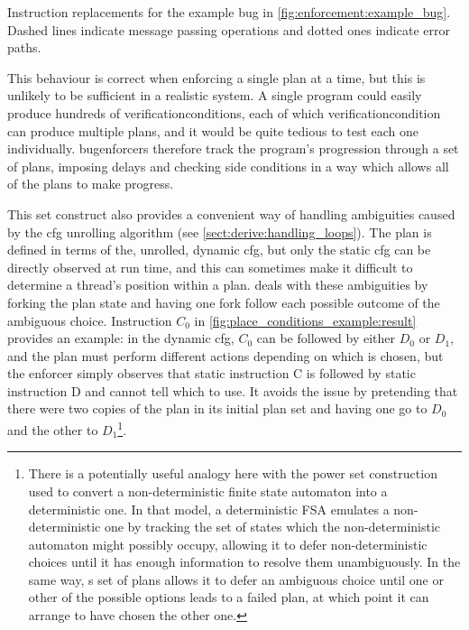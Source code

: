 \begin{sanefig}
  {\hfill}
  \caption{Instruction replacements for the example bug in
    \autoref{fig:enforcement:example_bug}.  Dashed lines indicate
    message passing operations and dotted ones indicate error paths.}
  \label{fig:enforcement:example_bug:replacements}
\end{sanefig}

This behaviour is correct when enforcing a single plan at a time, but
this is unlikely to be sufficient in a realistic system.  A single
program could easily produce hundreds of
\glspl{verificationcondition}, each of which
\gls{verificationcondition} can produce multiple plans, and it would
be quite tedious to test each one individually.  {\Technique}
\glspl{bugenforcer} therefore track the program's progression through
a set of plans, imposing delays and checking side conditions in a way
which allows all of the plans to make progress.

This set construct also provides a convenient way of handling
ambiguities caused by the \gls{cfg} unrolling algorithm (see
\autoref{sect:derive:handling_loops}).  The plan is defined in terms
of the, unrolled, dynamic \gls{cfg}, but only the static \gls{cfg} can
be directly observed at run time, and this can sometimes make it
difficult to determine a thread's position within a plan.
{\Technique} deals with these ambiguities by forking the plan state
and having one fork follow each possible outcome of the ambiguous
choice.  Instruction $C_0$ in
\autoref{fig:place_conditions_example:result} provides an example: in
the dynamic \gls{cfg}, $C_0$ can be followed by either $D_0$ or $D_1$,
and the plan must perform different actions depending on which is
chosen, but the enforcer simply observes that static instruction C is
followed by static instruction D and cannot tell which to use.  It
avoids the issue by pretending that there were two copies of the plan
in its initial plan set and having one go to $D_0$ and the other to
$D_1$\footnote{There is a potentially useful analogy here with the
  power set construction used to convert a non-deterministic finite
  state automaton into a deterministic one.  In that model, a
  deterministic FSA emulates a non-deterministic one by tracking the
  set of states which the non-deterministic automaton might possibly
  occupy, allowing it to defer non-deterministic choices until it has
  enough information to resolve them unambiguously.  In the same way,
  {\technique}s set of plans allows it to defer an ambiguous choice
  until one or other of the possible options leads to a failed plan,
  at which point it can arrange to have chosen the other one.}.

